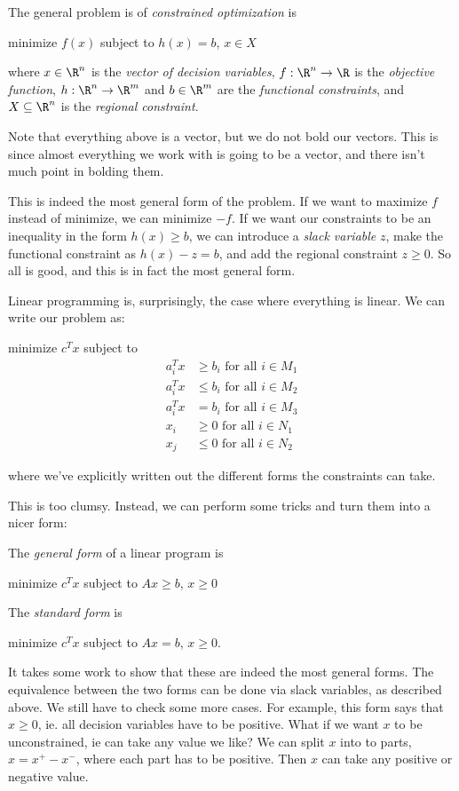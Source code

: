 \documentclass[a4paper]{article}
\begin{document}
\begin{defi}
  The general problem is of \emph{constrained optimization} is
  \begin{center}
    minimize $f(x)$ subject to $h(x) = b$, $x\in X$
  \end{center}
  where $x\in \R^n$ is the \emph{vector of decision variables}, $f: \R^n \to \R$ is the \emph{objective function}, $h: \R^n \to \R^m$ and $b\in \R^m$ are the \emph{functional constraints}, and $X\subseteq \R^n$ is the \emph{regional constraint}.
\end{defi}
Note that everything above is a vector, but we do not bold our vectors. This is since almost everything we work with is going to be a vector, and there isn't much point in bolding them.

This is indeed the most general form of the problem. If we want to maximize $f$ instead of minimize, we can minimize $-f$. If we want our constraints to be an inequality in the form $h(x) \geq b$, we can introduce a \emph{slack variable} $z$, make the functional constraint as $h(x) - z = b$, and add the regional constraint $z \geq 0$. So all is good, and this is in fact the most general form.

Linear programming is, surprisingly, the case where everything is linear. We can write our problem as:
\begin{center}
  minimize $c^Tx$ subject to
  \begin{align*}
    a_i^Tx &\geq b_i \text{ for all }i \in M_1\\
    a_i^Tx &\leq b_i \text{ for all }i \in M_2\\
    a_i^Tx &= b_i \text{ for all }i \in M_3\\
    x_i &\geq 0 \text{ for all }i \in N_1\\
    x_j &\leq 0 \text{ for all }i \in N_2
  \end{align*}
\end{center}
where we've explicitly written out the different forms the constraints can take.

This is too clumsy. Instead, we can perform some tricks and turn them into a nicer form:
\begin{defi}
  The \emph{general form} of a linear program is
  \begin{center}
    minimize $c^T x$ subject to $Ax \geq b$, $x \geq 0$
  \end{center}
  The \emph{standard form} is
  \begin{center}
    minimize $c^T x$ subject to $Ax = b$, $x \geq 0$.
  \end{center}
\end{defi}
It takes some work to show that these are indeed the most general forms. The equivalence between the two forms can be done via slack variables, as described above. We still have to check some more cases. For example, this form says that $x \geq 0$, ie. all decision variables have to be positive. What if we want $x$ to be unconstrained, ie can take any value we like? We can split $x$ into to parts, $x = x^+ - x^-$, where each part has to be positive. Then $x$ can take any positive or negative value.
\end{document}
